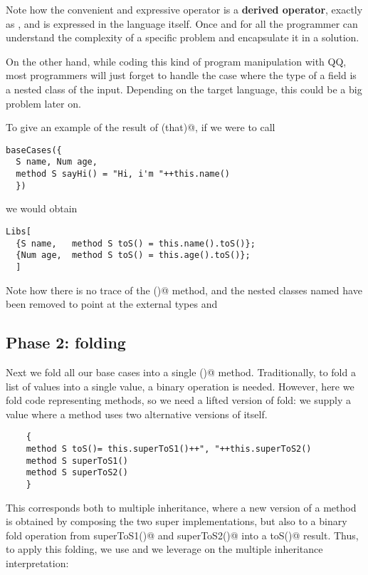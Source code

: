  Note how the convenient and expressive operator \Q@RedirectType@ is a \textbf{derived operator},
 exactly as \Q@Stringable@,
 and is expressed in the language itself. Once and for all the programmer can understand
 the complexity of a specific problem and encapsulate it in a solution.

 On the other hand, while coding this kind of program manipulation with QQ, most programmers
 will just forget to handle the case where the type of a field is a nested class of the input.
 Depending on the target language, this could be a big problem later on.


To give an example of the result of \Q@baseCases(that)@, if we were to call 

\begin{lstlisting}
baseCases({
  S name, Num age,
  method S sayHi() = "Hi, i'm "++this.name()
  })
\end{lstlisting}

 we would obtain

\begin{lstlisting}
Libs[
  {S name,   method S toS() = this.name().toS()};
  {Num age,  method S toS() = this.age().toS()};
  ]
\end{lstlisting}

Note how there is no trace of the \Q@sayHi()@ method, and the
nested classes named \Q@T@ have been removed to point at the
external types \Q@S@ and \Q@Num@


\subsection*{Phase 2: folding}
Next we fold all our base cases into a single \Q@toS()@ method.
Traditionally, to fold a list of values into a single value, a binary operation is needed.
However, here we fold code representing methods,
so we need a lifted version of fold:
 we supply a \Q@Library@ value where a method
uses two alternative versions of itself. 

\begin{lstlisting}
    {
    method S toS()= this.superToS1()++", "++this.superToS2()
    method S superToS1()
    method S superToS2()
    }
\end{lstlisting}

This corresponds both to multiple inheritance, where a new version of a method is obtained by composing the two super implementations,
but also to a binary fold operation from \Q@S superToS1()@ and \Q@S superToS2()@
into a \Q@S toS()@ result.
Thus, to apply this folding, we use \Q@Override@ and we leverage on the multiple inheritance interpretation:

